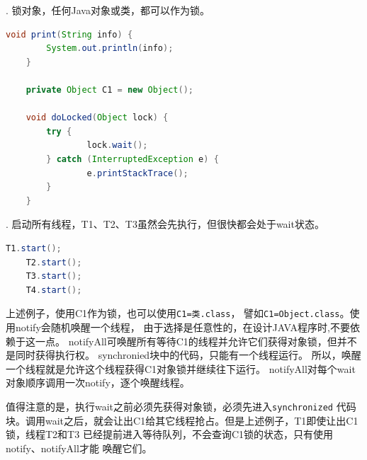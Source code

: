 . 锁对象，任何Java对象或类，都可以作为锁。
\begin{lstlisting}[language=Java]
	void print(String info) {
		System.out.println(info);
	}

	private Object C1 = new Object();

	void doLocked(Object lock) {
		try {
				lock.wait();
		} catch (InterruptedException e) {
				e.printStackTrace();
		}
	}
\end{lstlisting}
\noindent
\begin{center}
\begin{minipage}{\textwidth}
\begin{parcolumns}{2}
\colplacechunks
\end{parcolumns}\end{minipage}\end{center}
. 启动所有线程，T1、T2、T3虽然会先执行，但很快都会处于wait状态。
\begin{lstlisting}[language=Java]
	T1.start();
	T2.start();
	T3.start();
	T4.start();
\end{lstlisting}

\noindent
上述例子，使用C1作为锁，也可以使用\lstinline{C1=类.class}，
譬如\lstinline{C1=Object.class}。使用notify会随机唤醒一个线程，
由于选择是任意性的，在设计JAVA程序时,不要依赖于这一点。
notifyAll可唤醒所有等待C1的线程并允许它们获得对象锁，但并不是同时获得执行权。
synchronied块中的代码，只能有一个线程运行。
所以，唤醒一个线程就是允许这个线程获得C1对象锁并继续往下运行。 
notifyAll对每个wait对象顺序调用一次notify，逐个唤醒线程。

值得注意的是，执行wait之前必须先获得对象锁，必须先进入\lstinline{synchronized}
代码块。调用wait之后，就会让出C1给其它线程抢占。但是上述例子，T1即使让出C1锁，线程T2和T3
已经提前进入等待队列，不会查询C1锁的状态，只有使用notify、notifyAll才能
唤醒它们。

